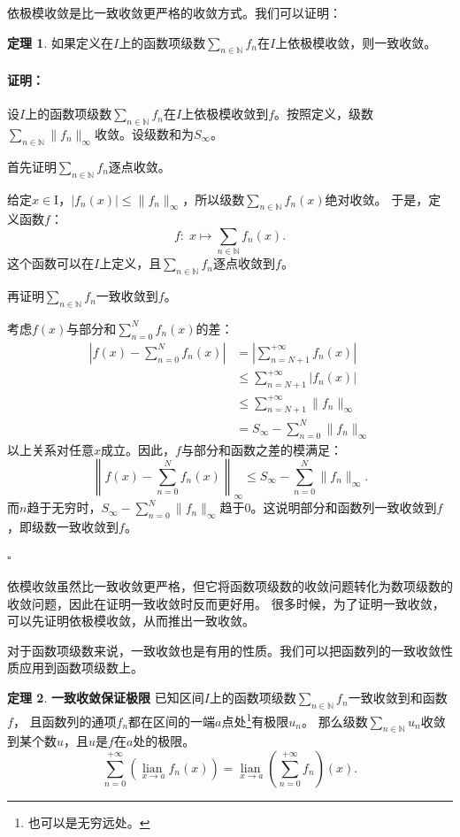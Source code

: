 \documentclass[12pt,UTF8]{ctexbook}
\newcommand{\lian}[1]{
    \underset{#1}{\operatorname{lian}\,}
}
\theoremstyle{definition}
\newtheorem{tm}{定理}[section]
\theoremstyle{plain}
\renewenvironment{proof}{\paragraph{\textbf{证明：}}}{\hfill$\square$}
\begin{document}
\begin{appendix}
依极模收敛是比一致收敛更严格的收敛方式。我们可以证明：
\begin{tm}
    如果定义在$I$上的函数项级数$\sum_{n\in\mathbb{N}} f_n$在$I$上依极模收敛，则一致收敛。
\end{tm}

\begin{proof}
    设$I$上的函数项级数$\sum_{n\in\mathbb{N}} f_n$在$I$上依极模收敛到$f$。按照定义，级数
    $\sum_{n\in\mathbb{N}} \|f_n\|_{\infty}$收敛。设级数和为$S_{\infty}$。

    首先证明$\sum_{n\in\mathbb{N}} f_n$逐点收敛。

    给定$x\in $I，$|f_n(x)| \leqslant \| f_n \|_{\infty}$，所以级数$\sum_{n\in\mathbb{N}} f_n(x)$绝对收敛。
    于是，定义函数$f$：
    $$ f : \; x\mapsto \sum_{n\in\mathbb{N}} f_n(x). $$
    这个函数可以在$I$上定义，且$\sum_{n\in\mathbb{N}} f_n$逐点收敛到$f$。

    再证明$\sum_{n\in\mathbb{N}} f_n$一致收敛到$f$。

    考虑$f(x)$与部分和$\sum_{n=0}^N f_n(x)$的差：
    \begin{align*}
        \left| f(x) - \sum_{n=0}^N f_n(x) \right| &= \left| \sum_{n=N+1}^{+\infty} f_n(x) \right| \\
        &\leqslant \sum_{n=N+1}^{+\infty} |f_n(x)| \\
        &\leqslant \sum_{n=N+1}^{+\infty} \|f_n\|_{\infty} \\
        &= S_{\infty} - \sum_{n=0}^N \|f_n\|_{\infty}
    \end{align*}
    以上关系对任意$x$成立。因此，$f$与部分和函数之差的模满足：
    $$ \left\| f(x) - \sum_{n=0}^N f_n(x) \right\|_{\infty} \leqslant S_{\infty} - \sum_{n=0}^N \|f_n\|_{\infty}. $$
    而$n$趋于无穷时，$S_{\infty} - \sum_{n=0}^N \|f_n\|_{\infty}$趋于$0$。这说明部分和函数列一致收敛到$f$，即级数一致收敛到$f$。

\end{proof}

依模收敛虽然比一致收敛更严格，但它将函数项级数的收敛问题转化为数项级数的收敛问题，因此在证明一致收敛时反而更好用。
很多时候，为了证明一致收敛，可以先证明依极模收敛，从而推出一致收敛。

对于函数项级数来说，一致收敛也是有用的性质。我们可以把函数列的一致收敛性质应用到函数项级数上。

\begin{tm}{\textbf{一致收敛保证极限}}
    已知区间$I$上的函数项级数$\sum_{n\in\mathbb{N}} f_n$一致收敛到和函数$f$，
    且函数列的通项$f_n$都在区间的一端$a$点处\footnote{也可以是无穷远处。}有极限$u_n$。
    那么级数$\sum_{n\in\mathbb{N}} u_n$收敛到某个数$u$，且$u$是$f$在$a$处的极限。
    $$ \sum_{n=0}^{+\infty} \left(\lian{x\to a} f_n(x) \right) = \lian{x\to a} \left(\sum_{n=0}^{+\infty} f_n\right)(x). $$
\end{tm}


\end{appendix}
\end{document}
